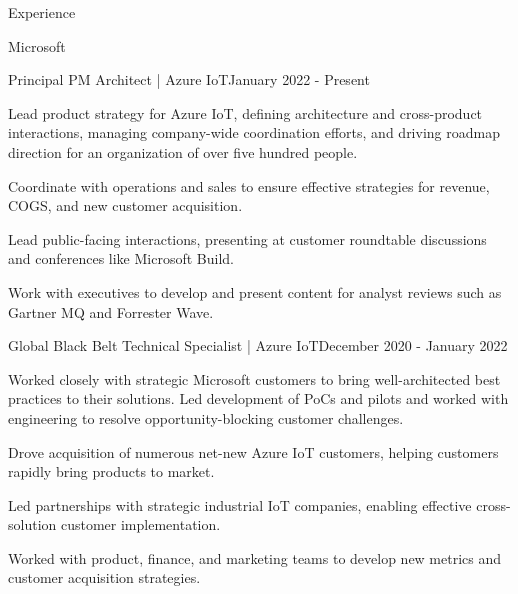 \documentclass{resume} %
\begin{document}
\begin{rSection}{Experience}


\begin{rSubsection}{Microsoft}{}{}


    \begin{rSubSubsection}{Principal PM Architect | Azure IoT}{January 2022 - Present}{}{} 

        \item Lead product strategy for Azure IoT, defining architecture and cross-product interactions,  managing company-wide coordination efforts, and driving roadmap direction for an organization of over five hundred people.
        \item Coordinate with operations and sales to ensure effective strategies for revenue, COGS, and new customer acquisition.
        \item Lead public-facing interactions, presenting at customer roundtable discussions and conferences like Microsoft Build.
        \item Work with executives to develop and present content for analyst reviews such as Gartner MQ and Forrester Wave.
        
    \end{rSubSubsection}


    \begin{rSubSubsection}{Global Black Belt Technical Specialist | Azure IoT}{December 2020 - January 2022}{}{} 

        \item Worked closely with strategic Microsoft customers to bring well-architected best practices to their solutions. Led development of PoCs and pilots and worked with engineering to resolve opportunity-blocking customer challenges.  
        \item Drove acquisition of numerous net-new Azure IoT customers, helping customers rapidly bring products to market.
        \item Led partnerships with strategic industrial IoT companies, enabling effective cross-solution customer implementation.
        \item Worked with product, finance, and marketing teams to develop new metrics and customer acquisition strategies.
    

\end{rSubSubsection}
\end{rSubsection}
\end{rSection}
\end{document}
